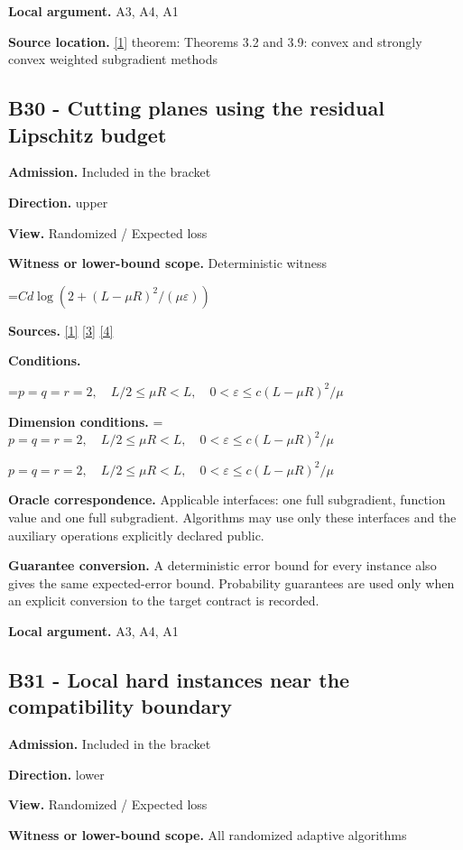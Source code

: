 \documentclass[10pt,a4paper]{article}
\newcommand{\AtlasMath}[1]{\par\begingroup\centering\setbox0=\hbox{$\displaystyle #1$}\ifdim\wd0>1.4\linewidth\typeout{ATLAS WIDE FORMULA: \the\wd0}\fi\ifdim\wd0>\linewidth\resizebox{\linewidth}{!}{\box0}\else\box0\fi\par\endgroup}
\newcommand{\AtlasInlineMath}[1]{\begingroup\setbox0=\hbox{$#1$}\ifdim\wd0>.4\linewidth\endgroup\AtlasMath{#1}\else\endgroup$#1$\fi}
\begin{document}
\textbf{Local argument.} A3, A4, A1

\textbf{Source location.} \href{https://arxiv.org/pdf/1405.4980}{[1]} theorem: Theorems 3.2 and 3.9: convex and strongly convex weighted subgradient methods

\subsection{B30 - Cutting planes using the residual Lipschitz budget}
\textbf{Admission.} Included in the bracket

\textbf{Direction.} upper

\textbf{View.} Randomized / Expected loss

\textbf{Witness or lower-bound scope.} Deterministic witness

\AtlasMath{Cd\log(2+(L-\mu R)^2/(\mu\varepsilon))}
\textbf{Sources.} \href{https://arxiv.org/pdf/1405.4980}{[1]} \href{https://www2.isye.gatech.edu/~nemirovs/MOR_AccuracyCertificates.pdf}{[3]} \href{https://arxiv.org/pdf/2609.20701}{[4]}

\textbf{Conditions.} 
\AtlasMath{p=q=r=2,\quad L/2\le\mu R<L,\quad0<\varepsilon\le c(L-\mu R)^2/\mu}


\textbf{Dimension conditions.} \AtlasInlineMath{p=q=r=2,\quad L/2\le\mu R<L,\quad0<\varepsilon\le c(L-\mu R)^2/\mu}

\textbf{Oracle correspondence.} Applicable interfaces: one full subgradient, function value and one full subgradient. Algorithms may use only these interfaces and the auxiliary operations explicitly declared public.

\textbf{Guarantee conversion.} A deterministic error bound for every instance also gives the same expected-error bound. Probability guarantees are used only when an explicit conversion to the target contract is recorded.

\textbf{Local argument.} A3, A4, A1

\subsection{B31 - Local hard instances near the compatibility boundary}
\textbf{Admission.} Included in the bracket

\textbf{Direction.} lower

\textbf{View.} Randomized / Expected loss

\textbf{Witness or lower-bound scope.} All randomized adaptive algorithms
\end{document}
